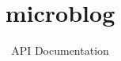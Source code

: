 \documentclass{article}
\begin{document}



\title{microblog}
\author{API Documentation}
\maketitle


\addtolength{\parskip}{-2ex}
\tableofcontents
\addtolength{\parskip}{2ex}

\end{document}
